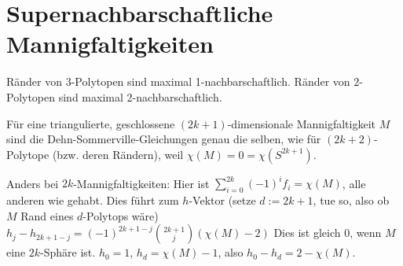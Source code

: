 \chapter{Supernachbarschaftliche Mannigfaltigkeiten}



Ränder von $3$-Polytopen sind maximal 1-nachbarschaftlich.
Ränder von $2$-Polytopen sind maximal 2-nachbarschaftlich.

Für eine triangulierte, geschlossene $(2k+1)$-dimensionale Mannigfaltigkeit $M$ sind die Dehn-Sommerville-Gleichungen genau die selben, wie für $(2k+2)$-Polytope (bzw. deren Rändern), weil $\chi(M) = 0 = \chi(S^{2k+1})$.

Anders bei $2k$-Mannigfaltigkeiten:
Hier ist $\sum_{i=0}^{2k} (-1)^i f_i = \chi(M)$, alle anderen wie gehabt.
Dies führt zum $h$-Vektor (setze $d := 2k + 1$, tue so, also ob $M$ Rand eines $d$-Polytops wäre)
\begin{math}
    h_j - h_{2k+1-j} = (-1)^{2k+1-j} \binom{2k+1}{j} (\chi(M) - 2)
\end{math}
Dies ist gleich $0$, wenn $M$ eine $2k$-Sphäre ist.
$h_0 = 1$, $h_d = \chi(M) - 1$, also $h_0 - h_d = 2 - \chi(M)$.

